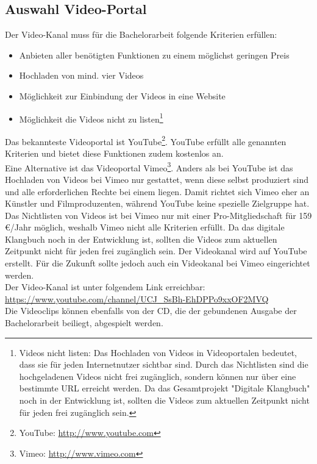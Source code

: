 \subsection{Auswahl Video-Portal}
Der Video-Kanal muss für die Bachelorarbeit folgende Kriterien erfüllen:

\begin{itemize}
\item Anbieten aller benötigten Funktionen zu einem möglichst geringen Preis
\item Hochladen von mind. vier Videos
\item Möglichkeit zur Einbindung der Videos in eine Website
\item Möglichkeit die Videos nicht zu listen\footnote{Videos nicht listen: Das Hochladen von Videos in Videoportalen bedeutet, dass sie für jeden Internetnutzer sichtbar sind. Durch das Nichtlisten sind die hochgeladenen Videos nicht frei zugänglich, sondern können nur über eine bestimmte URL erreicht werden. Da das Gesamtprojekt "Digitale Klangbuch" noch in der Entwicklung ist, sollten die Videos zum aktuellen Zeitpunkt nicht für jeden frei zugänglich sein.}
\end{itemize}


Das bekannteste Videoportal ist YouTube\footnote{YouTube: \url{http://www.youtube.com}}\cite{statYT}. YouTube erfüllt alle genannten Kriterien und bietet diese Funktionen zudem kostenlos an.\\
Eine Alternative ist das Videoportal Vimeo\footnote{Vimeo: \url{http://www.vimeo.com}}. Anders als bei YouTube ist das Hochladen von Videos bei Vimeo nur gestattet, wenn diese selbst produziert sind und alle erforderlichen Rechte bei einem liegen. Damit richtet sich Vimeo eher an Künstler und Filmproduzenten, während YouTube keine spezielle Zielgruppe hat.\cite{chip} Das Nichtlisten von Videos ist bei Vimeo nur mit einer Pro-Mitgliedschaft für 159 \euro /Jahr möglich, weshalb Vimeo nicht alle Kriterien erfüllt. Da das digitale Klangbuch noch in der Entwicklung ist, sollten die Videos zum aktuellen Zeitpunkt nicht für jeden frei zugänglich sein. Der Videokanal wird auf YouTube erstellt. Für die Zukunft sollte jedoch auch ein Videokanal bei Vimeo eingerichtet werden.\\

Der Video-Kanal ist unter folgendem Link erreichbar:\\\url{https://www.youtube.com/channel/UCJ_SsBh-EhDPPo9xxOF2MVQ}\\
Die Videoclips können ebenfalls von der CD, die der gebundenen Ausgabe der Bachelorarbeit beiliegt, abgespielt werden.



